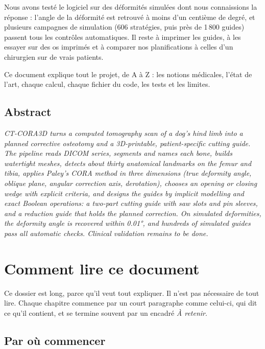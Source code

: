 \documentclass[11pt, a4paper, oneside, openany]{report}
\begin{document}
Nous avons testé le logiciel sur des déformités simulées dont nous connaissions la réponse : l'angle de la déformité
est retrouvé à moins d'un centième de degré, et plusieurs campagnes de simulation (606 stratégies, puis près de
1\,800 guides) passent tous les contrôles automatiques. Il reste à imprimer les guides, à les essayer sur des os
imprimés et à comparer nos planifications à celles d'un chirurgien sur de vrais patients.

Ce document explique tout le projet, de A à Z : les notions médicales, l'état de l'art, chaque calcul, chaque fichier
du code, les tests et les limites.

\section*{Abstract}
\emph{CT-CORA3D turns a computed tomography scan of a dog's hind limb into a planned corrective osteotomy and a
3D-printable, patient-specific cutting guide. The pipeline reads DICOM series, segments and names each bone, builds
watertight meshes, detects about thirty anatomical landmarks on the femur and tibia, applies Paley's CORA method in
three dimensions (true deformity angle, oblique plane, angular correction axis, derotation), chooses an opening or
closing wedge with explicit criteria, and designs the guides by implicit modelling and exact Boolean operations: a
two-part cutting guide with saw slots and pin sleeves, and a reduction guide that holds the planned correction. On simulated
deformities, the deformity angle is recovered within 0.01°, and hundreds of simulated guides pass all automatic
checks. Clinical validation remains to be done.}

\chapter*{Comment lire ce document}

\begin{chapeau}
Ce dossier est long, parce qu'il veut tout expliquer. Il n'est pas nécessaire de tout lire. Chaque chapitre commence
par un court paragraphe comme celui-ci, qui dit ce qu'il contient, et se termine souvent par un encadré
\emph{À retenir}.
\end{chapeau}

\section*{Par où commencer}
\end{document}
